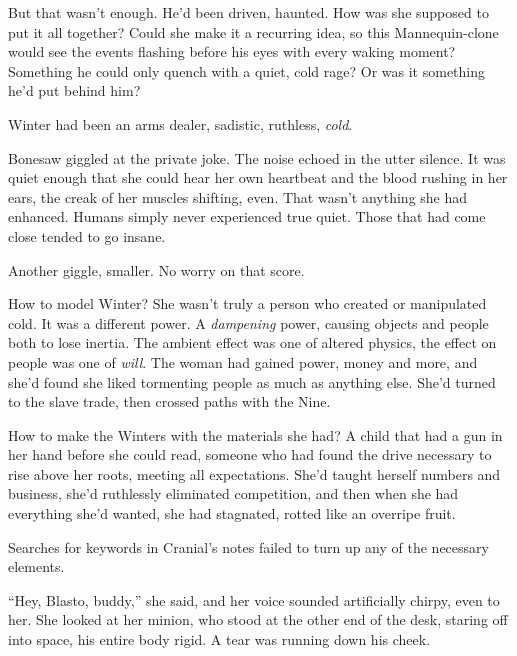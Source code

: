 But that wasn't enough.  He'd been driven, haunted.  How was she supposed to put it all together?  Could she make it a recurring idea, so this Mannequin-clone would see the events flashing before his eyes with every waking moment?  Something he could only quench with a quiet, cold rage?  Or was it something he'd put behind him?



Winter had been an arms dealer, sadistic, ruthless, \emph{cold}.



Bonesaw giggled at the private joke.  The noise echoed in the utter silence.  It was quiet enough that she could hear her own heartbeat and the blood rushing in her ears, the creak of her muscles shifting, even.  That wasn't anything she had enhanced.  Humans simply never experienced true quiet.  Those that had come close tended to go insane.



Another giggle, smaller.  No worry on that score.



How to model Winter?  She wasn't truly a person who created or manipulated cold.  It was a different power.  A \emph{dampening} power, causing objects and people both to lose inertia.  The ambient effect was one of altered physics, the effect on people was one of \emph{will}.  The woman had gained power, money and more, and she'd found she liked tormenting people as much as anything else.  She'd turned to the slave trade, then crossed paths with the Nine.



How to make the Winters with the materials she had?  A child that had a gun in her hand before she could read, someone who had found the drive necessary to rise above her roots, meeting all expectations.  She'd taught herself numbers and business, she'd ruthlessly eliminated competition, and then when she had everything she'd wanted, she had stagnated, rotted like an overripe fruit.



Searches for keywords in Cranial's notes failed to turn up any of the necessary elements.



``Hey, Blasto, buddy,'' she said, and her voice sounded artificially chirpy, even to her.  She looked at her minion, who stood at the other end of the desk, staring off into space, his entire body rigid.  A tear was running down his cheek.



